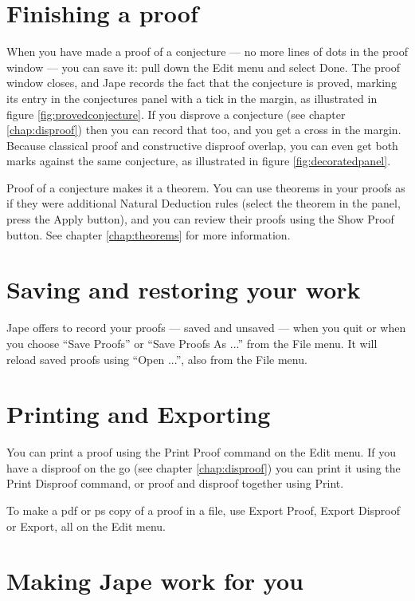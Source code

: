 \documentclass[11pt]{book}
\newcommand{\figref}[1]{figure \ref{fig:#1}}
\newcommand{\chapref}[1]{chapter \ref{chap:#1}}
\begin{document}
\section{Finishing a proof}

When you have made a proof of a conjecture --- no more lines of dots in the proof window --- you can save it: pull down the Edit menu and select Done. The proof window closes, and Jape records the fact that the conjecture is proved, marking its entry in the conjectures panel with a tick in the margin, as illustrated in \figref{provedconjecture}. If you disprove a conjecture (see \chapref{disproof}) then you can record that too, and you get a cross in the margin. Because classical proof and constructive disproof overlap, you can even get both marks against the same conjecture, as illustrated in \figref{decoratedpanel}.

Proof of a conjecture makes it a theorem. You can use theorems in your proofs as if they were additional Natural Deduction rules (select the theorem in the panel, press the Apply button), and you can review their proofs using the Show Proof button. See \chapref{theorems} for more information.

\section{Saving and restoring your work}

Jape offers to record your proofs --- saved and unsaved --- when you quit or when you choose ``Save Proofs'' or ``Save Proofs As ...'' from the File menu. It will reload saved proofs using ``Open ...'', also from the File menu. 

\section{Printing and Exporting}

You can print a proof using the Print Proof command on the Edit menu. If you have a disproof on the go (see \chapref{disproof}) you can print it using the Print Disproof command, or proof and disproof together using Print. 

To make a pdf or ps copy of a proof in a file, use Export Proof, Export Disproof or Export, all on the Edit menu.

\section{Making Jape work for you}
\end{document}
